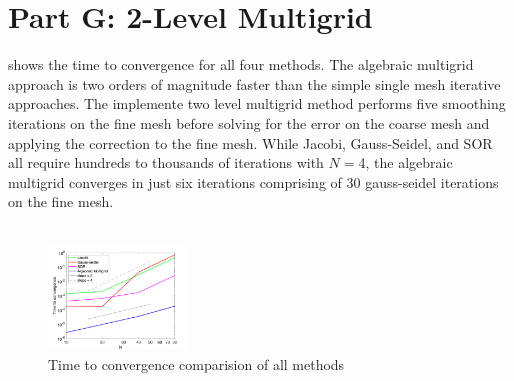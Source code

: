 \documentclass[reqno, 12pt]{amsart}
\begin{document}
    \section{Part G: 2-Level Multigrid}
    \noindent{} shows the time to convergence for all four methods.
    The algebraic multigrid approach is two orders of magnitude faster than the simple single mesh iterative approaches.
    The implemente two level multigrid method performs five smoothing iterations on the fine mesh before solving for the error on the coarse mesh and applying the correction to the fine mesh.
    While Jacobi, Gauss-Seidel, and SOR all require hundreds to thousands of iterations with $N=$4, the algebraic multigrid converges in just six iterations comprising of 30 gauss-seidel iterations on the fine mesh. \\~\\
    \color{red}{Your feedback says "results?" with no indication of what results your're looking for. The question states "Solve the problem using a 2-level geometric multigrid method. Compare the computational time with other methods.". It appears to me that the expected results are a comparision of the computational time with the other methods, which I clearly present. I'm not sure why points were deducted for this. I gave exactly what was asked for.}
    \begin{figure}
        \centering
        \includegraphics[width=0.33\textwidth]{partG.png}
        \caption{Time to convergence comparision of all methods}
        \label{fig:G}
    \end{figure}
\end{document}
